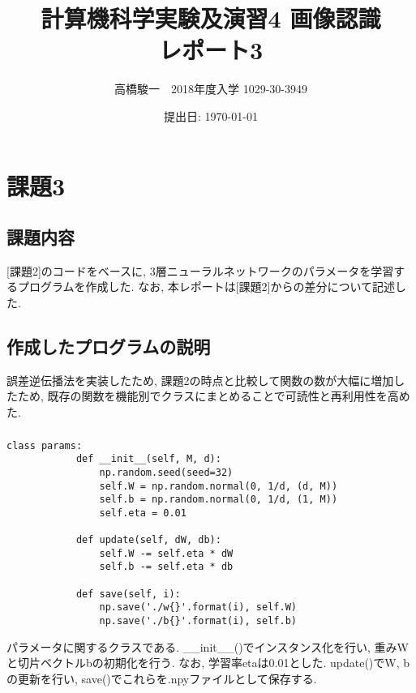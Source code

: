 \documentclass[a4j, titlepage]{jarticle}
\begin{document}
\title{計算機科学実験及演習4 画像認識　\\ \bf レポート3}
\author{高橋駿一　2018年度入学 1029-30-3949}
\date{提出日: \today} %
\maketitle

\clearpage

\section*{課題3}
\subsection*{課題内容}
[課題2]のコードをベースに, 3層ニューラルネットワークのパラメータを学習するプログラムを作成した. なお, 本レポートは[課題2]からの差分について記述した.

\subsection*{作成したプログラムの説明}
誤差逆伝播法を実装したため, 課題2の時点と比較して関数の数が大幅に増加したため, 既存の関数を機能別でクラスにまとめることで可読性と再利用性を高めた.
    \subsubsection*{}
        \begin{lstlisting}[caption=パラメータの設定, 更新, 保存,label=fuga]
        class params:
            def __init__(self, M, d):
                np.random.seed(seed=32)
                self.W = np.random.normal(0, 1/d, (d, M))
                self.b = np.random.normal(0, 1/d, (1, M))
                self.eta = 0.01

            def update(self, dW, db):
                self.W -= self.eta * dW
                self.b -= self.eta * db

            def save(self, i):
                np.save('./w{}'.format(i), self.W)
                np.save('./b{}'.format(i), self.b)
        \end{lstlisting}
        パラメータに関するクラスである.
        \_\_init\_\_()でインスタンス化を行い, 重みWと切片ベクトルbの初期化を行う. なお, 学習率etaは0.01とした.
        update()でW, bの更新を行い, save()でこれらを.npyファイルとして保存する.
\end{document}
